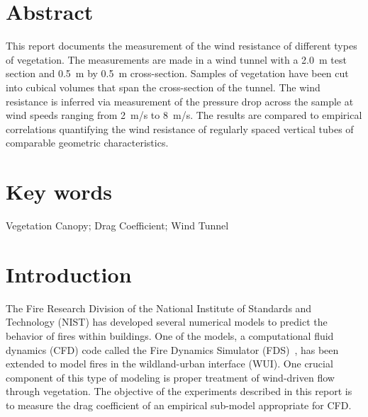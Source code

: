 \documentclass[12pt]{article}
\begin{document}
\pagestyle{plain}

\section*{Abstract}

This report documents the measurement of the wind resistance of different types of vegetation. The measurements are made in a wind tunnel with a 2.0~\si{m} test section and 0.5~\si{m} by 0.5~\si{m} cross-section. Samples of vegetation have been cut into cubical volumes that span the cross-section of the tunnel. The wind resistance is inferred via measurement of the pressure drop across the sample at wind speeds ranging from 2~\si{m/s} to 8~\si{m/s}. The results are compared to empirical correlations quantifying the wind resistance of regularly spaced vertical tubes of comparable geometric characteristics.

\section*{Key words}

Vegetation Canopy; Drag Coefficient; Wind Tunnel

\cleardoublepage

\begin{center}
	\tableofcontents
	\listoftables
	\listoffigures
\end{center}

\cleardoublepage

\pagestyle{plain}


\section{Introduction}
\label{sec:intro}

The Fire Research Division of the National Institute of Standards and Technology (NIST) has developed several numerical models to predict the behavior of fires within buildings. One of the models, a computational fluid dynamics (CFD) code called the Fire Dynamics Simulator (FDS)~\cite{FDS_Tech_Guide}, has been extended to model fires in the wildland-urban interface (WUI). One crucial component of this type of modeling is proper treatment of wind-driven flow through vegetation. The objective of the experiments described in this report is to measure the drag coefficient of an empirical sub-model appropriate for CFD.
\end{document}
